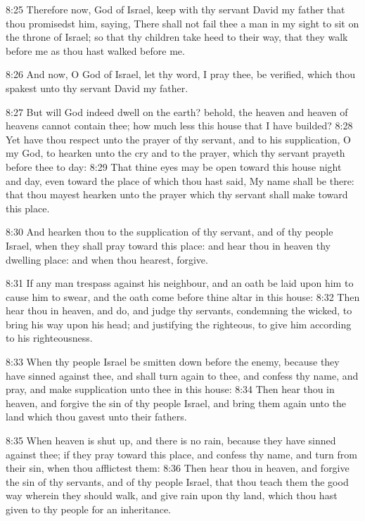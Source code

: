 8:25 Therefore now, \LORD God of Israel, keep with thy servant David my
father that thou promisedst him, saying, There shall not fail thee a
man in my sight to sit on the throne of Israel; so that thy children
take heed to their way, that they walk before me as thou hast walked
before me.

8:26 And now, O God of Israel, let thy word, I pray thee, be verified,
which thou spakest unto thy servant David my father.

8:27 But will God indeed dwell on the earth? behold, the heaven and
heaven of heavens cannot contain thee; how much less this house that I
have builded?  8:28 Yet have thou respect unto the prayer of thy
servant, and to his supplication, O \LORD my God, to hearken unto the
cry and to the prayer, which thy servant prayeth before thee to day:
8:29 That thine eyes may be open toward this house night and day, even
toward the place of which thou hast said, My name shall be there: that
thou mayest hearken unto the prayer which thy servant shall make
toward this place.

8:30 And hearken thou to the supplication of thy servant, and of thy
people Israel, when they shall pray toward this place: and hear thou
in heaven thy dwelling place: and when thou hearest, forgive.

8:31 If any man trespass against his neighbour, and an oath be laid
upon him to cause him to swear, and the oath come before thine altar
in this house: 8:32 Then hear thou in heaven, and do, and judge thy
servants, condemning the wicked, to bring his way upon his head; and
justifying the righteous, to give him according to his righteousness.

8:33 When thy people Israel be smitten down before the enemy, because
they have sinned against thee, and shall turn again to thee, and
confess thy name, and pray, and make supplication unto thee in this
house: 8:34 Then hear thou in heaven, and forgive the sin of thy
people Israel, and bring them again unto the land which thou gavest
unto their fathers.

8:35 When heaven is shut up, and there is no rain, because they have
sinned against thee; if they pray toward this place, and confess thy
name, and turn from their sin, when thou afflictest them: 8:36 Then
hear thou in heaven, and forgive the sin of thy servants, and of thy
people Israel, that thou teach them the good way wherein they should
walk, and give rain upon thy land, which thou hast given to thy people
for an inheritance.

